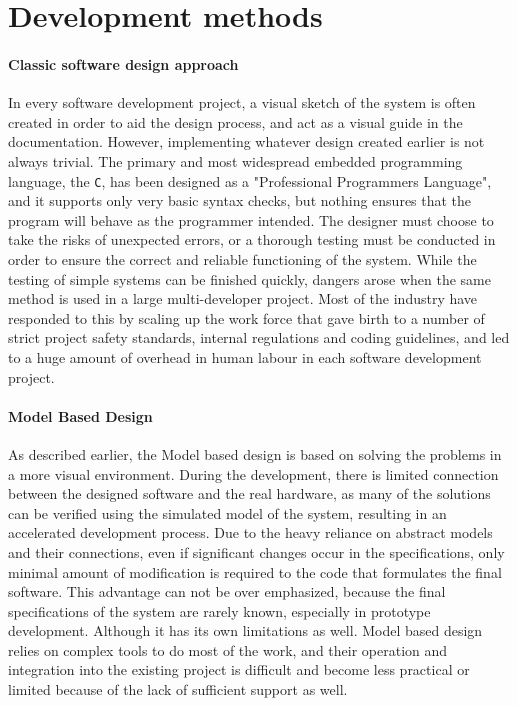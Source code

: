 \section{Development methods}

\paragraph{Classic software design approach}

In every software development project, a visual sketch of the system is often created in order to aid the design process, and act as a visual guide in the documentation. However, implementing whatever design created earlier is not always trivial. The primary and most widespread embedded programming language, the \verb!C!, has been designed as a "Professional Programmers Language", and it supports only very basic syntax checks, but nothing ensures that the program will behave as the programmer intended. The designer must choose to take the risks of unexpected errors, or a thorough testing must be conducted in order to ensure the correct and reliable functioning of the system. While the testing of simple systems can be finished quickly, dangers arose when the same method is used in a large multi-developer project. Most of the industry have responded to this by scaling up the work force that gave birth to a number of strict project safety standards, internal regulations and coding guidelines\cite{misra}, and led to a huge amount of overhead in human labour in each software development project.

\paragraph{Model Based Design}

As described earlier, the Model based design is based on solving the problems in a more visual environment. During the development, there is  limited connection between the designed software and the real hardware, as many of the solutions can be verified using the simulated model of the system, resulting in an accelerated development process\cite{locomotive}.
Due to the heavy reliance on abstract models and their connections, even if significant changes occur in the specifications, only minimal amount of modification is required to the code that formulates the final software. This advantage can not be over emphasized, because the final specifications of the system are rarely known, especially in prototype development.
Although it has its own limitations as well. Model based design relies on complex tools to do most of the work, and their operation and integration into the existing project is difficult and become less practical or limited because of the lack of sufficient support as well.

